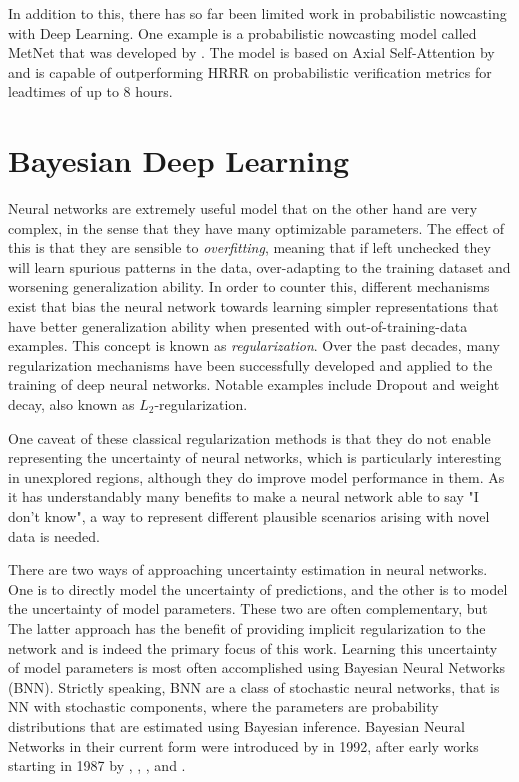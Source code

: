 In addition to this, there has so far been limited work in probabilistic nowcasting with Deep Learning. One example is a probabilistic nowcasting model called MetNet that was developed by \citet{sonderby_metnet_2020}. The model is based on Axial Self-Attention by \citet{ho_axial_2019} and is capable of outperforming HRRR on probabilistic verification metrics for leadtimes of up to 8 hours. 
 
\section{Bayesian Deep Learning}
\label{section:bdl_theory}

	Neural networks are extremely useful model that on the other hand are very complex, in the sense that they have many optimizable parameters. The effect of this is that they are sensible to \textit{overfitting}, meaning that if left unchecked they will learn spurious patterns in the data, over-adapting to the training dataset and worsening generalization ability. In order to counter this, different mechanisms exist that bias the neural network towards learning simpler representations that have better generalization ability when presented with out-of-training-data examples. This concept is known as \textit{regularization}. Over the past decades, many regularization mechanisms have been successfully developed and applied to the training of deep neural networks. Notable examples include Dropout and weight decay, also known as $L_2$-regularization. \cite{srivastava2014dropout, bishop2006pattern} 
	
	One caveat of these classical regularization methods is that they do not enable representing the uncertainty of neural networks, which is particularly interesting in unexplored regions, although they do improve model performance in them. As it has understandably many benefits to make a neural network able to say "I don't know", a way to represent different plausible scenarios arising with novel data is needed. 
	
	There are two ways of approaching uncertainty estimation in neural networks. One is to directly model the uncertainty of predictions, and the other is to model the uncertainty of model parameters. These two are often complementary, but The latter approach has the benefit of providing implicit regularization to the network and is indeed the primary focus of this work. Learning this uncertainty of model parameters is most often accomplished using Bayesian Neural Networks (BNN). Strictly speaking, BNN are a class of stochastic neural networks, that is NN with stochastic components, where the parameters are probability distributions that are estimated using Bayesian inference. Bayesian Neural Networks in their current form were introduced by \citet{mackay1992practical} in 1992, after early works starting in 1987 by \citet{denker1987large}, \citet{tishby_consistent_1989}, \citet{denker_transforming_1990}, and \citet{buntine1991bayesian}. 
	
